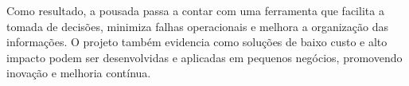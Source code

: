 \documentclass[
	12pt,				%
	openany,			%
	twoside,			%
	a4paper,			%
	english,			%
	french,				%
	spanish,			%
	brazil				%
	]{abntex2}
\begin{document}
Como resultado, a pousada passa a contar com uma ferramenta que facilita a tomada de decisões, minimiza falhas operacionais e melhora a organização das informações. O projeto também evidencia como soluções de baixo custo e alto impacto podem ser desenvolvidas e aplicadas em pequenos negócios, promovendo inovação e melhoria contínua.


\postextual




%
%

\end{document}
